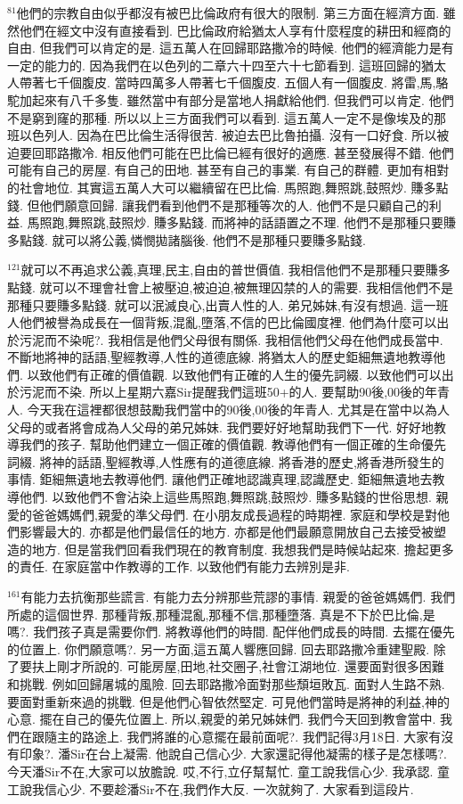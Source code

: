 \documentclass{book}
\begin{document}
$^{81}$他們的宗教自由似乎都沒有被巴比倫政府有很大的限制.
第三方面在經濟方面.
雖然他們在經文中沒有直接看到.
巴比倫政府給猶太人享有什麼程度的耕田和經商的自由.
但我們可以肯定的是.
這五萬人在回歸耶路撒冷的時候.
他們的經濟能力是有一定的能力的.
因為我們在以色列的二章六十四至六十七節看到.
這班回歸的猶太人帶著七千個腹皮.
當時四萬多人帶著七千個腹皮.
五個人有一個腹皮.
將雷,馬,駱駝加起來有八千多隻.
雖然當中有部分是當地人捐獻給他們.
但我們可以肯定.
他們不是窮到窿的那種.
所以以上三方面我們可以看到.
這五萬人一定不是像埃及的那班以色列人.
因為在巴比倫生活得很苦.
被迫去巴比魯拍攝.
沒有一口好食.
所以被迫要回耶路撒冷.
相反他們可能在巴比倫已經有很好的適應.
甚至發展得不錯.
他們可能有自己的房屋.
有自己的田地.
甚至有自己的事業.
有自己的群體.
更加有相對的社會地位.
其實這五萬人大可以繼續留在巴比倫.
馬照跑,舞照跳,鼓照炒.
賺多點錢.
但他們願意回歸.
讓我們看到他們不是那種等次的人.
他們不是只顧自己的利益.
馬照跑,舞照跳,鼓照炒.
賺多點錢.
而將神的話語置之不理.
他們不是那種只要賺多點錢.
就可以將公義,憐憫拋諸腦後.
他們不是那種只要賺多點錢.

$^{121}$就可以不再追求公義,真理,民主,自由的普世價值.
我相信他們不是那種只要賺多點錢.
就可以不理會社會上被壓迫,被迫迫,被無理囚禁的人的需要.
我相信他們不是那種只要賺多點錢.
就可以泯滅良心,出賣人性的人.
弟兄姊妹,有沒有想過.
這一班人他們被譽為成長在一個背叛,混亂,墮落,不信的巴比倫國度裡.
他們為什麼可以出於污泥而不染呢?.
我相信是他們父母很有關係.
我相信他們父母在他們成長當中.
不斷地將神的話語,聖經教導,人性的道德底線.
將猶太人的歷史鉅細無遺地教導他們.
以致他們有正確的價值觀.
以致他們有正確的人生的優先詞綴.
以致他們可以出於污泥而不染.
所以上星期六嘉Sir提醒我們這班50+的人.
要幫助90後,00後的年青人.
今天我在這裡都很想鼓勵我們當中的90後,00後的年青人.
尤其是在當中以為人父母的或者將會成為人父母的弟兄姊妹.
我們要好好地幫助我們下一代.
好好地教導我們的孩子.
幫助他們建立一個正確的價值觀.
教導他們有一個正確的生命優先詞綴.
將神的話語,聖經教導,人性應有的道德底線.
將香港的歷史,將香港所發生的事情.
鉅細無遺地去教導他們.
讓他們正確地認識真理,認識歷史.
鉅細無遺地去教導他們.
以致他們不會沾染上這些馬照跑,舞照跳,鼓照炒.
賺多點錢的世俗思想.
親愛的爸爸媽媽們,親愛的準父母們.
在小朋友成長過程的時期裡.
家庭和學校是對他們影響最大的.
亦都是他們最信任的地方.
亦都是他們最願意開放自己去接受被塑造的地方.
但是當我們回看我們現在的教育制度.
我想我們是時候站起來.
擔起更多的責任.
在家庭當中作教導的工作.
以致他們有能力去辨別是非.

$^{161}$有能力去抗衡那些謊言.
有能力去分辨那些荒謬的事情.
親愛的爸爸媽媽們.
我們所處的這個世界.
那種背叛,那種混亂,那種不信,那種墮落.
真是不下於巴比倫,是嗎?.
我們孩子真是需要你們.
將教導他們的時間.
配伴他們成長的時間.
去擺在優先的位置上.
你們願意嗎?.
另一方面,這五萬人響應回歸.
回去耶路撒冷重建聖殿.
除了要扶上剛才所說的.
可能房屋,田地,社交圈子,社會江湖地位.
還要面對很多困難和挑戰.
例如回歸屠城的風險.
回去耶路撒冷面對那些頹垣敗瓦.
面對人生路不熟.
要面對重新來過的挑戰.
但是他們心智依然堅定.
可見他們當時是將神的利益,神的心意.
擺在自己的優先位置上.
所以,親愛的弟兄姊妹們.
我們今天回到教會當中.
我們在跟隨主的路途上.
我們將誰的心意擺在最前面呢?.
我們記得3月18日.
大家有沒有印象?.
潘Sir在台上凝需.
他說自己信心少.
大家還記得他凝需的樣子是怎樣嗎?.
今天潘Sir不在,大家可以放膽說.
哎,不行,立仔幫幫忙.
童工說我信心少.
我承認.
童工說我信心少.
不要趁潘Sir不在,我們作大反.
一次就夠了.
大家看到這段片.
\end{document}

